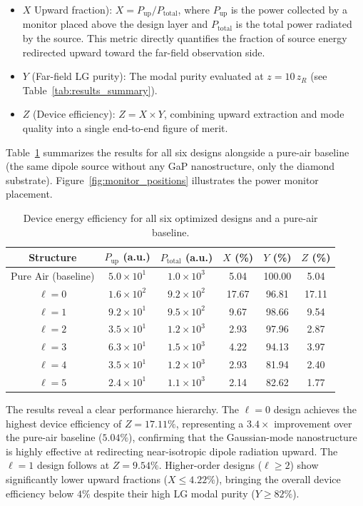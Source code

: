 \begin{itemize}
    \item $X$ Upward fraction): $X = P_\text{up}/P_\text{total}$, where $P_\text{up}$ is the power collected by a monitor placed above the design layer and $P_\text{total}$ is the total power radiated by the source. This metric directly quantifies the fraction of source energy redirected upward toward the far-field observation side.
    \item $Y$ (Far-field LG purity): The modal purity evaluated at $z = 10\,z_R$ (see Table~\ref{tab:results_summary}).
    \item $Z$ (Device efficiency): $Z = X \times Y$, combining upward extraction and mode quality into a single end-to-end figure of merit.
\end{itemize}

Table~\ref{tab:device_efficiency} summarizes the results for all six designs alongside a pure-air baseline (the same dipole source without any GaP nanostructure, only the diamond substrate). Figure~\ref{fig:monitor_positions} illustrates the power monitor placement.

\begin{table}[htb]
\centering
\caption{Device energy efficiency for all six optimized designs and a pure-air baseline.}
\label{tab:device_efficiency}
\begin{tabular}{cccccc}
\hline
Structure & $P_\text{up}$ (a.u.) & $P_\text{total}$ (a.u.) & $X$ (\%) & $Y$ (\%) & $Z$ (\%) \\
\hline
Pure Air (baseline) & $5.0\times10^{1}$ & $1.0\times10^{3}$ & 5.04  & 100.00 & 5.04  \\
$\ell = 0$ & $1.6\times10^{2}$ & $9.2\times10^{2}$ & 17.67 & 96.81  & 17.11 \\
$\ell = 1$ & $9.2\times10^{1}$ & $9.5\times10^{2}$ &  9.67 & 98.66  &  9.54 \\
$\ell = 2$ & $3.5\times10^{1}$ & $1.2\times10^{3}$ &  2.93 & 97.96  &  2.87 \\
$\ell = 3$ & $6.3\times10^{1}$ & $1.5\times10^{3}$ &  4.22 & 94.13  &  3.97 \\
$\ell = 4$ & $3.5\times10^{1}$ & $1.2\times10^{3}$ &  2.93 & 81.94  &  2.40 \\
$\ell = 5$ & $2.4\times10^{1}$ & $1.1\times10^{3}$ &  2.14 & 82.62  &  1.77 \\
\hline
\end{tabular}
\end{table}

The results reveal a clear performance hierarchy. The $\ell = 0$ design achieves the highest device efficiency of $Z = 17.11\%$, representing a $3.4\times$ improvement over the pure-air baseline ($5.04\%$), confirming that the Gaussian-mode nanostructure is highly effective at redirecting near-isotropic dipole radiation upward. The $\ell = 1$ design follows at $Z = 9.54\%$. Higher-order designs ($\ell \ge 2$) show significantly lower upward fractions ($X \le 4.22\%$), bringing the overall device efficiency below $4\%$ despite their high LG modal purity ($Y \ge 82\%$).


